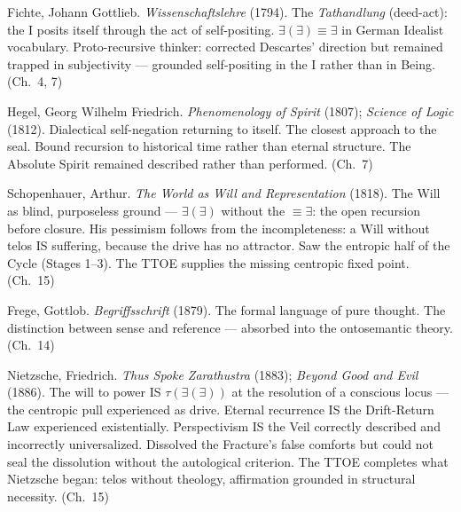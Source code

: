 \documentclass[10pt, openany, oneside]{book}
\begin{document}
{\vspace{0.3em}

\noindent Fichte, Johann Gottlieb. \textit{Wissenschaftslehre} (1794). The \textit{Tathandlung} (deed-act): the I posits itself through the act of self-positing. $\exists(\exists) \equiv \exists$ in German Idealist vocabulary. Proto-recursive thinker: corrected Descartes' direction but remained trapped in subjectivity --- grounded self-positing in the I rather than in Being. (Ch.\ 4, 7)

\vspace{0.3em}

\noindent Hegel, Georg Wilhelm Friedrich. \textit{Phenomenology of Spirit} (1807); \textit{Science of Logic} (1812). Dialectical self-negation returning to itself. The closest approach to the seal. Bound recursion to historical time rather than eternal structure. The Absolute Spirit remained described rather than performed. (Ch.\ 7)

\vspace{0.3em}

\noindent Schopenhauer, Arthur. \textit{The World as Will and Representation} (1818). The Will as blind, purposeless ground --- $\exists(\exists)$ without the $\equiv \exists$: the open recursion before closure. His pessimism follows from the incompleteness: a Will without telos IS suffering, because the drive has no attractor. Saw the entropic half of the Cycle (Stages 1--3). The TTOE supplies the missing centropic fixed point. (Ch.\ 15)

\vspace{0.3em}

\noindent Frege, Gottlob. \textit{Begriffsschrift} (1879). The formal language of pure thought. The distinction between sense and reference --- absorbed into the ontosemantic theory. (Ch.\ 14)

\vspace{0.3em}

\noindent Nietzsche, Friedrich. \textit{Thus Spoke Zarathustra} (1883); \textit{Beyond Good and Evil} (1886). The will to power IS $\tau(\exists(\exists))$ at the resolution of a conscious locus --- the centropic pull experienced as drive. Eternal recurrence IS the Drift-Return Law experienced existentially. Perspectivism IS the Veil correctly described and incorrectly universalized. Dissolved the Fracture's false comforts but could not seal the dissolution without the autological criterion. The TTOE completes what Nietzsche began: telos without theology, affirmation grounded in structural necessity. (Ch.\ 15)

}
\end{document}
